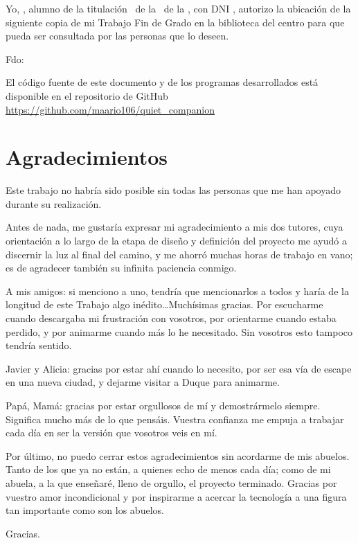 Yo, \textbf{\theauthor}, alumno de la titulación \grado \ de la \myFacultyShort \ de la \myUni, con DNI \dni, autorizo la ubicación de la siguiente copia de mi Trabajo Fin de Grado en la biblioteca del centro para que pueda ser consultada por las personas que lo deseen.

\vspace{4cm}

\noindent Fdo: \theauthor

\vspace{1cm}

\begin{flushright}
\myLocation
\end{flushright}

\vspace{3cm}

\doclicenseThis El código fuente de este documento y de los programas desarrollados está disponible en el repositorio de GitHub \url{https://github.com/maario106/quiet_companion}


\chapter*{Agradecimientos}
\thispagestyle{empty}

       \vspace{1cm}

Este trabajo no habría sido posible sin todas las personas que me han apoyado durante su realización.

Antes de nada, me gustaría expresar mi agradecimiento a mis dos tutores, cuya orientación a lo largo de la etapa de diseño y definición del proyecto me ayudó a discernir la luz al final del camino, y me ahorró muchas horas de trabajo en vano; es de agradecer también su infinita paciencia conmigo.

A mis amigos: si menciono a uno, tendría que mencionarlos a todos y haría de la longitud de este Trabajo algo inédito\ldots Muchísimas gracias. Por escucharme cuando descargaba mi frustración con vosotros, por orientarme cuando estaba perdido, y por animarme cuando más lo he necesitado. Sin vosotros esto tampoco tendría sentido.

Javier y Alicia: gracias por estar ahí cuando lo necesito, por ser esa vía de escape en una nueva ciudad, y dejarme visitar a Duque para animarme.

Papá, Mamá: gracias por estar orgullosos de mí y demostrármelo siempre. Significa mucho más de lo que pensáis. Vuestra confianza me empuja a trabajar cada día en ser la versión que vosotros veis en mí. 

Por último, no puedo cerrar estos agradecimientos sin acordarme de mis abuelos. Tanto de los que ya no están, a quienes echo de menos cada día; como de mi abuela, a la que enseñaré, lleno de orgullo, el proyecto terminado. Gracias por vuestro amor incondicional y por inspirarme a acercar la tecnología a una figura tan importante como son los abuelos.

Gracias.
\pagestyle{fancy}
